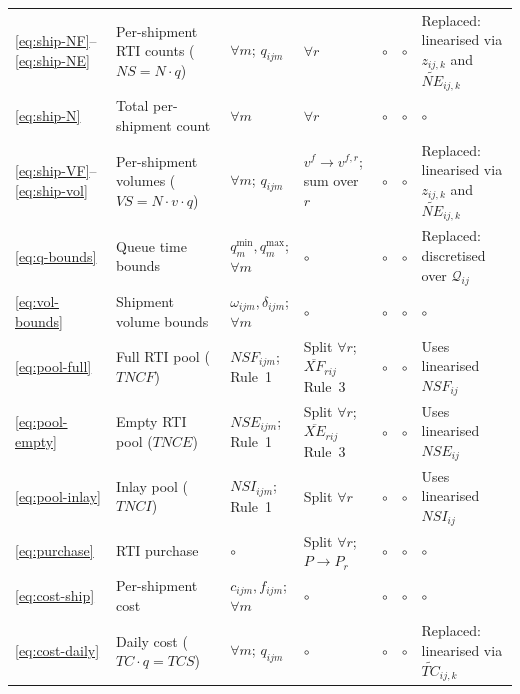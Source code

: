 \begin{longtable}{lp{1.6cm}p{2.1cm}p{2.1cm}p{1.6cm}p{1.6cm}p{2.2cm}}
\eqref{eq:ship-NF}--\eqref{eq:ship-NE}
  & Per-shipment RTI counts ($NS = N \cdot q$)
  & $\forall m$; $q_{ijm}$
  & $\forall r$
  & $\circ$
  & $\circ$
  & Replaced: linearised via $z_{ij,k}$ and $\widetilde{NE}_{ij,k}$ \\[4pt]

\eqref{eq:ship-N}
  & Total per-shipment count
  & $\forall m$
  & $\forall r$
  & $\circ$
  & $\circ$
  & $\circ$ \\[4pt]

\eqref{eq:ship-VF}--\eqref{eq:ship-vol}
  & Per-shipment volumes ($VS = N \cdot v \cdot q$)
  & $\forall m$; $q_{ijm}$
  & $v^f\!\to v^{f,r}$; sum over $r$
  & $\circ$
  & $\circ$
  & Replaced: linearised via $z_{ij,k}$ and $\widetilde{NE}_{ij,k}$ \\[4pt]

\eqref{eq:q-bounds}
  & Queue time bounds
  & $q^{\min}_m,q^{\max}_m$; $\forall m$
  & $\circ$
  & $\circ$
  & $\circ$
  & Replaced: discretised over $\mathcal{Q}_{ij}$ \\[4pt]

\eqref{eq:vol-bounds}
  & Shipment volume bounds
  & $\omega_{ijm},\delta_{ijm}$; $\forall m$
  & $\circ$
  & $\circ$
  & $\circ$
  & $\circ$ \\[4pt]

\eqref{eq:pool-full}
  & Full RTI pool ($TNCF$)
  & $NSF_{ijm}$; Rule~1
  & Split $\forall r$; $\overline{XF}_{rij}$ Rule~3
  & $\circ$
  & $\circ$
  & Uses linearised $NSF_{ij}$ \\[4pt]

\eqref{eq:pool-empty}
  & Empty RTI pool ($TNCE$)
  & $NSE_{ijm}$; Rule~1
  & Split $\forall r$; $\overline{XE}_{rij}$ Rule~3
  & $\circ$
  & $\circ$
  & Uses linearised $NSE_{ij}$ \\[4pt]

\eqref{eq:pool-inlay}
  & Inlay pool ($TNCI$)
  & $NSI_{ijm}$; Rule~1
  & Split $\forall r$
  & $\circ$
  & $\circ$
  & Uses linearised $NSI_{ij}$ \\[4pt]

\eqref{eq:purchase}
  & RTI purchase
  & $\circ$
  & Split $\forall r$; $P\!\to P_r$
  & $\circ$
  & $\circ$
  & $\circ$ \\[4pt]

\eqref{eq:cost-ship}
  & Per-shipment cost
  & $c_{ijm},f_{ijm}$; $\forall m$
  & $\circ$
  & $\circ$
  & $\circ$
  & $\circ$ \\[4pt]

\eqref{eq:cost-daily}
  & Daily cost ($TC \cdot q = TCS$)
  & $\forall m$; $q_{ijm}$
  & $\circ$
  & $\circ$
  & $\circ$
  & Replaced: linearised via $\widetilde{TC}_{ij,k}$ \\[4pt]


\end{longtable}

